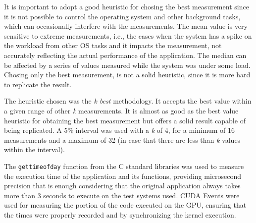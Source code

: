 It is important to adopt a good heuristic for chosing the best measurement since it is not possible to control the operating system and other background tasks, which can occasionally interfere with the measurements. The mean value is very sensitive to extreme measurements, i.e., the cases when the system has a spike on the workload from other OS tasks and it impacts the measurement, not accurately reflecting the actual performance of the application. The median can be affected by a series of values measured while the system was under some load. Chosing only the best measurement, is not a solid heuristic, since it is more hard to replicate the result.

The heuristic chosen was the \textit{k best} methodology. It accepts the best value within a given range of other \textit{k} measurements. It is almost as good as the best value heuristic for obtaining the best measurement but offers a solid result capable of being replicated. A 5\% interval was used with a \textit{k} of 4, for a minimum of 16 measurements and a maximum of 32 (in case that there are less than \textit{k} values within the interval).

The \texttt{gettimeofday} function from the C standard libraries was used to measure the execution time of the application and its functions, providing microsecond precision that is enough considering that the original application always takes more than 3 seconds to execute on the test systems used. CUDA Events were used for measuring the portion of the code executed on the GPU, ensuring that the times were properly recorded and by synchronizing the kernel execution.

